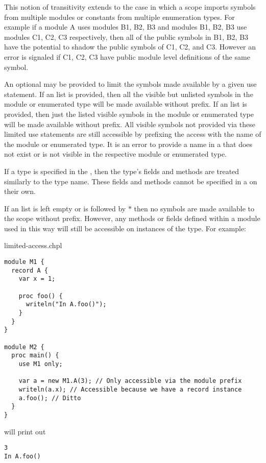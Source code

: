 This notion of transitivity extends to the case in which a scope
imports symbols from multiple modules or constants from multiple
enumeration types.  For example if a module A uses modules B1, B2, B3
and modules B1, B2, B3 use modules C1, C2, C3 respectively, then all
of the public symbols in B1, B2, B3 have the potential to shadow the
public symbols of C1, C2, and C3.  However an error is signaled if
C1, C2, C3 have public module level definitions of the same symbol.

An optional  may be provided to limit the symbols made
available by a given use statement.  If an  list is provided, then all
the visible but unlisted symbols in the module or enumerated type will be made
available without prefix.  If an  list is provided, then just the
listed visible symbols in the module or enumerated type will be made available
without prefix.  All visible symbols not provided via these limited use
statements are still accessible by prefixing the access with the name of the module or enumerated type.
It is an error to provide a name in a  that does not
exist or is not visible in the respective module or enumerated type.

If a type is specified in the , then the type's fields
and methods are treated similarly to the type name.  These fields and methods
cannot be specified in a  on their own.


If an  list is left empty or  is followed by $*$ then no
symbols are made available to the scope without prefix.  However, any methods or
fields defined within a module used in this way will still be accessible on
instances of the type.  For example:

\begin{chapelexample}{limited-access.chpl}
\begin{chapel}
\begin{verbatim}
module M1 {
  record A {
    var x = 1;

    proc foo() {
      writeln("In A.foo()");
    }
  }
}

module M2 {
  proc main() {
    use M1 only;

    var a = new M1.A(3); // Only accessible via the module prefix
    writeln(a.x); // Accessible because we have a record instance
    a.foo(); // Ditto
  }
}
\end{verbatim}
\end{chapel}

will print out
\begin{chapelprintoutput}
\begin{verbatim}
3
In A.foo() 
\end{verbatim}
\end{chapelprintoutput}
\end{chapelexample}

